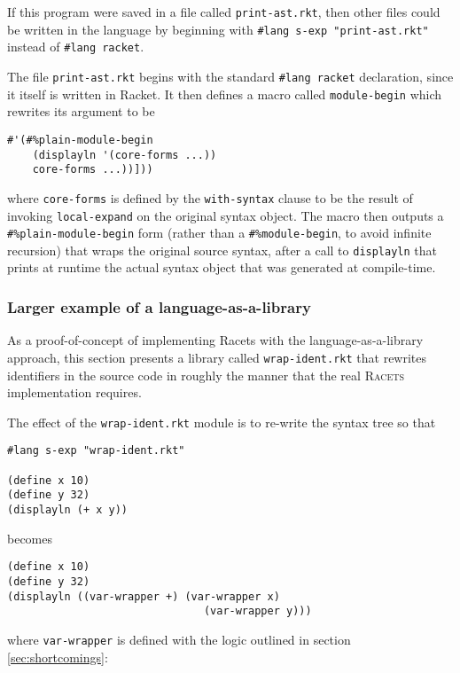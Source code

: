 \documentclass{article}
\begin{document}
If this program were saved in a file called \texttt{print-ast.rkt}, then other files could be written in the language by beginning with \texttt{\#lang s-exp "print-ast.rkt"} instead of \texttt{\#lang racket}.

The file \texttt{print-ast.rkt} begins with the standard \texttt{\#lang racket} declaration, since it itself is written in Racket. It then defines a macro called \texttt{module-begin} which rewrites its argument to be

\begin{lstlisting}
#'(#%plain-module-begin
    (displayln '(core-forms ...))
    core-forms ...))]))
\end{lstlisting}

\noindent where \texttt{core-forms} is defined by the \texttt{with-syntax} clause to be the result of invoking \texttt{local-expand} on the original syntax object. The macro then outputs a \texttt{\#\%plain-module-begin} form (rather than a \texttt{\#\%module-begin}, to avoid infinite recursion) that wraps the original source syntax, after a call to \texttt{displayln} that prints at runtime the actual syntax object that was generated at compile-time.


\subsubsection{Larger example of a language-as-a-library}
As a proof-of-concept of implementing Racets with the language-as-a-library approach, this section presents a library called \texttt{wrap-ident.rkt} that rewrites identifiers in the source code in roughly the manner that the real \textsc{Racets} implementation requires.

The effect of the \texttt{wrap-ident.rkt} module is to re-write the syntax tree so that

\begin{lstlisting}
#lang s-exp "wrap-ident.rkt"

(define x 10)
(define y 32)
(displayln (+ x y))
\end{lstlisting}

\noindent becomes

\begin{lstlisting}
(define x 10)
(define y 32)
(displayln ((var-wrapper +) (var-wrapper x)
                               (var-wrapper y)))
\end{lstlisting}

\noindent where \texttt{var-wrapper} is defined with the logic outlined in section \ref{sec:shortcomings}:
\end{document}
